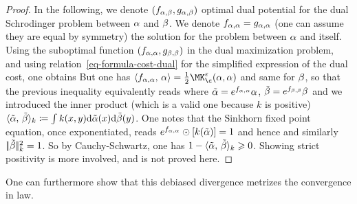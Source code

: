 \begin{proof}	
	In the following, we denote $(f_{\alpha,\beta},g_{\alpha,\beta})$ optimal dual potential for the 
	dual Schrodinger problem between $\alpha$ and $\beta$.
	We denote $f_{\alpha,\alpha}=g_{\alpha,\alpha}$ (one can assume they are equal by symmetry) the solution for the problem between $\alpha$ and itself. 
	Using the suboptimal function $(f_{\alpha,\alpha},g_{\beta,\beta})$ in the dual maximization problem, and using relation~\eqref{eq-formula-cost-dual} for the simplified expression of the dual cost, one obtains
	But one has $\dotp{f_{\al,\al}}{\al} = \frac{1}{2}\MK_\c^\epsilon(\al,\al)$ and same for $\beta$, so that the previous inequality equivalently reads
	where $\tilde{\alpha}=e^{f_{\alpha,\alpha}} \alpha$, $\tilde{\beta}=e^{f_{\beta,\beta}} \beta$
	and we introduced the inner product (which is a valid one because $k$ is positive) 
	$\langle \tilde{\alpha},\,\tilde{\beta}\rangle_{k} \coloneqq \int k(x,y) \mathrm{d}\tilde{\alpha}(x) \mathrm{d}\tilde{\beta}(y)$.
	One notes that the Sinkhorn fixed point equation, once exponentiated, reads
	$e^{f_{\alpha,\alpha}} \odot [ k( \tilde {\alpha} ) ] = 1$ and hence
	and similarly $|\!| \tilde {\beta} |\!|_k^2=1$. So by Cauchy-Schwartz, one has
	$1 - \langle \tilde{\alpha},\,\tilde{\beta}\rangle_{k} \geqslant 0$.
	Showing strict positivity is more involved, and is not proved here. 
\end{proof}

One can furthermore show that this debiased divergence metrizes the convergence in law. 
      

   
   
